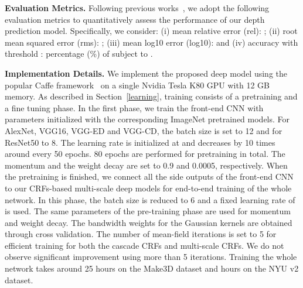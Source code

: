 \documentclass[10pt,twocolumn,letterpaper]{article}
\begin{document}
\textbf{Evaluation Metrics.}
Following previous works~\cite{eigen2015predicting,eigen2014depth,wang2015towards}, we adopt the following evaluation metrics 
to quantitatively assess the performance of our depth prediction model. Specifically, we consider: (i) mean relative error (rel): 
; (ii) root mean squared error (rms): 
; 
(iii) mean log10 error (log10):  and
(iv) accuracy with threshold : percentage (\%) of  subject to . 

\textbf{Implementation Details.}
We implement the proposed deep model using the popular Caffe framework~\cite{jia2014caffe} on a single Nvidia Tesla K80 GPU with 12 GB memory. 
As described in Section~\ref{learning}, training consists of a pretraining and a fine tuning phase. In the first phase, we train the front-end CNN with parameters initialized with the corresponding ImageNet pretrained models. For AlexNet, VGG16, VGG-ED and VGG-CD, the batch size is set to 12 and for ResNet50 to 8. 
The learning rate is initialized at  and decreases by 10 times around every 50 epochs. 80 epochs are performed for pretraining in total. 
The momentum and the weight decay are set to 0.9 and 0.0005, respectively. 
{When the pretraining is finished, we connect all the side outputs of the front-end CNN to our CRFs-based multi-scale deep models 
for end-to-end training of the whole network.} In this phase, the batch size is reduced to 6 and a fixed 
learning rate of  is used. The same parameters of the pre-training phase are 
used for momentum and weight decay. The bandwidth weights for the Gaussian kernels are obtained 
through cross validation. {The number of mean-field iterations is set to 5 for efficient training for both 
the cascade CRFs and multi-scale CRFs. We do not observe significant improvement using more than 5 iterations.} 
Training the whole network takes around 25 hours on the Make3D dataset and  hours on the NYU v2 dataset. 
\end{document}
